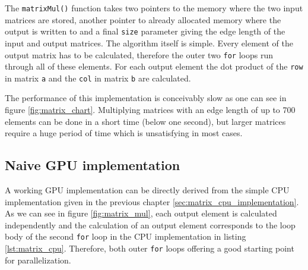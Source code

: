

The \lstinline!matrixMul()! function takes two pointers to the memory where the two input matrices are stored, another pointer to already allocated memory where the output is written to and a final \lstinline!size! parameter giving the edge length of the input and output matrices.
The algorithm itself is simple. Every element of the output matrix has to be calculated, therefore the outer two \lstinline!for! loops run through all of these elements. For each output element the dot product of the \lstinline!row! in matrix \lstinline!a! and the \lstinline!col! in matrix \lstinline!b! are calculated.

The performance of this implementation is conceivably slow as one can see in figure \ref{fig:matrix_chart}. Multiplying matrices with an edge length of up to 700 elements can be done in a short time (below one second), but larger matrices require a huge period of time which is unsatisfying in most cases.

\subsection{Naive GPU implementation}

A working GPU implementation can be directly derived from the simple CPU implementation given in the previous chapter \ref{sec:matrix_cpu_implementation}. As we can see in figure \ref{fig:matrix_mul}, each output element is calculated independently and the calculation of an output element corresponds to the loop body of the second \lstinline!for! loop in the CPU implementation in listing \ref{lst:matrix_cpu}. Therefore, both outer \lstinline!for! loops offering a good starting point for parallelization. 

